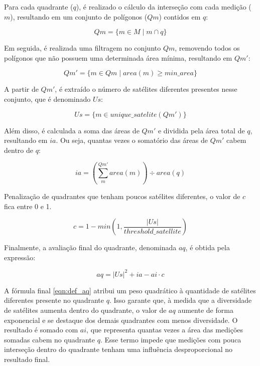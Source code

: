 \documentclass[cic,tc]{iiufrgs}
\begin{document}
Para cada quadrante ($q$), é realizado o cálculo da interseção com cada medição ($m$), resultando em um conjunto de polígonos ($Qm$) contidos em $q$:

\begin{equation} \label{eqn:def_qm}
Qm = \{ m \in M \mid m \cap q \}
\end{equation}

Em seguida, é realizada uma filtragem no conjunto $Qm$, removendo todos os polígonos que não possuem uma determinada área mínima, resultando em $Qm'$:

\begin{equation} \label{eqn:def_qm_line}
Qm' = \{ m \in Qm \mid area\left(m\right) \ge min\_area \}
\end{equation}

A partir de $Qm'$, é extraído o número de satélites diferentes presentes nesse conjunto, que é denominado $Us$:

\begin{equation} \label{eqn:def_us}
Us = \{ m \in unique\_satelite\left(Qm'\right) \}
\end{equation}

Além disso, é calculada a soma das áreas de $Qm'$ e dividida pela área total de $q$, resultando em $ia$. Ou seja, quantas vezes o somatório das áreas de $Qm'$ cabem dentro de $q$:

\begin{equation} \label{eqn:def_ia}
ia = \left(\sum_{m}^{Qm'} area\left(m\right)\right) \div area(q)
\end{equation}

Penalização de quadrantes que tenham poucos satélites diferentes, o valor de $c$ fica entre 0 e 1.

\begin{equation} \label{eqn:def_c}
c = 1 - min\left(1, \frac{|Us|}{threshold\_satellite}\right)
\end{equation}

Finalmente, a avaliação final do quadrante, denominada $aq$, é obtida pela expressão:

\begin{equation} \label{eqn:def_aq}
aq = |Us|^2 + ia - ai \cdot c
\end{equation}

A fórmula final \ref{eqn:def_aq} atribui um peso quadrático à quantidade de satélites diferentes presente no quadrante $q$. Isso garante que, à medida que a diversidade de satélites aumenta dentro do quadrante, o valor de $aq$ aumente de forma exponencial e se destaque dos demais quadrantes com menos diversidade. O resultado é somado com $ai$, que representa quantas vezes a área das medições somadas cabem no quadrante $q$. Esse termo impede que medições com pouca interseção dentro do quadrante tenham uma influência desproporcional no resultado final.
\end{document}
